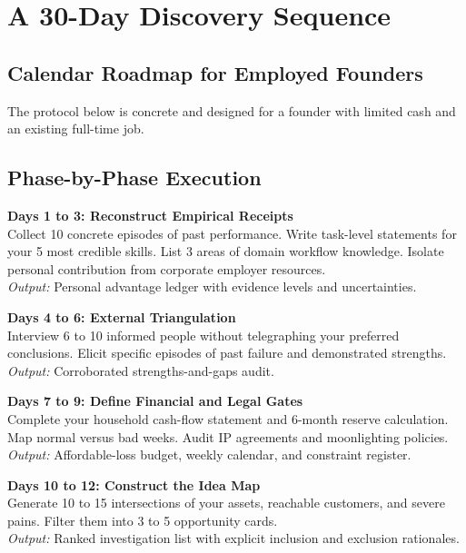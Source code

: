\section{A 30-Day Discovery Sequence}

\subsection{Calendar Roadmap for Employed Founders}

The protocol below is concrete and designed for a founder with limited cash and an existing full-time job.

\subsection{Phase-by-Phase Execution}

\textbf{Days 1 to 3: Reconstruct Empirical Receipts} \\
Collect 10 concrete episodes of past performance. Write task-level statements for your 5 most credible skills. List 3 areas of domain workflow knowledge. Isolate personal contribution from corporate employer resources. \\
\textit{Output:} Personal advantage ledger with evidence levels and uncertainties.

\textbf{Days 4 to 6: External Triangulation} \\
Interview 6 to 10 informed people without telegraphing your preferred conclusions. Elicit specific episodes of past failure and demonstrated strengths. \\
\textit{Output:} Corroborated strengths-and-gaps audit.

\textbf{Days 7 to 9: Define Financial and Legal Gates} \\
Complete your household cash-flow statement and 6-month reserve calculation. Map normal versus bad weeks. Audit IP agreements and moonlighting policies. \\
\textit{Output:} Affordable-loss budget, weekly calendar, and constraint register.

\textbf{Days 10 to 12: Construct the Idea Map} \\
Generate 10 to 15 intersections of your assets, reachable customers, and severe pains. Filter them into 3 to 5 opportunity cards. \\
\textit{Output:} Ranked investigation list with explicit inclusion and exclusion rationales.

